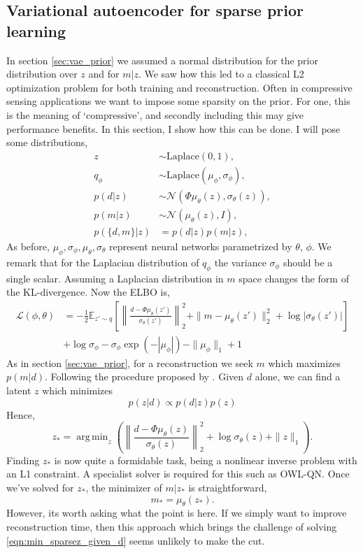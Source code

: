 \documentclass[12pt]{article}
\DeclareMathOperator*{\argmin}{arg\,min}
\begin{document}
\subsection{Variational autoencoder for sparse prior learning}\label{sec:vae_sparse_prior}
In section \ref{sec:vae_prior} we assumed a normal distribution for the prior distribution over $z$ and for $m|z$. We saw how this led to a classical L2 optimization problem for both training and reconstruction. Often in compressive sensing applications we want to impose some sparsity on the prior. For one, this is the meaning of `compressive', and secondly including this may give performance benefits. In this section, I show how this can be done. 
I will pose some distributions,
\begin{align}
z & \sim \textrm{Laplace}(0,1),\\
q_\phi & \sim \textrm{Laplace}(\mu_{\phi}, \sigma_{\phi}),\\
p(d|z) & \sim \mathcal{N}(\Phi \mu_{\theta}(z), \sigma_{\theta}(z) ),\\
p(m|z) & \sim \mathcal{N}(\mu_{\theta}(z), I),\\
p(\{d,m\}|z) & = p(d|z)p(m|z),
\end{align}
As before, $\mu_{\phi}, \sigma_{\phi}, \mu_{\theta},  \sigma_{\theta}$ represent neural networks parametrized by $\theta$, $\phi$. We remark that for the Laplacian distribution of $q_{\phi}$ the variance $\sigma_{\phi}$ should be a single scalar. Assuming a Laplacian distribution in $m$ space changes the form of the KL-divergence. Now the ELBO is,
\begin{align}
\mathcal{L}(\phi, \theta)&=-\frac{1}{2}\mathbb{E}_{z' \sim q}\left[ \left\|\frac{d-\Phi \mu_{\theta}(z')}{\sigma_{\theta}(z')}\right\|_2^2 
+ \|m- \mu_{\theta}(z')\|_2^2+ \log{|\sigma_{\theta}(z')|}\right] \nonumber\\
&+\log{\sigma_{\phi}}-\sigma_{\phi}\exp{(-|\mu_{\phi}|)}-\|\mu_{\phi}\|_1+1
\end{align}
As in section \ref{sec:vae_prior}, for a reconstruction we seek $m$ which maximizes $p(m|d)$. Following the procedure proposed by \cite{bora}. Given $d$ alone, we can find a latent $z$ which minimizes 
\begin{equation}
p(z|d) \propto p(d|z)p(z)
\end{equation}
Hence,
\begin{equation}
z_{*}=\argmin_z{\left(\left\|\frac{d-\Phi \mu_{\theta}(z)}{\sigma_{\theta}(z)}\right\|_2^2+\log{\sigma_{\theta}(z)}+\|z\|_1\right)}.\label{eqn:min_sparsez_given_d}
\end{equation} 
Finding $z_{*}$ is now quite a formidable task, being a nonlinear inverse problem with an L1 constraint. A specialist solver is required for this such as OWL-QN. Once we've solved for $z_{*}$, the minimizer of $m|z_{*}$ is straightforward,
\begin{equation}
m_{*}=\mu_{\theta}(z_*).
\end{equation}
However, its worth asking what the point is here. If we simply want to improve reconstruction time, then this approach which brings the challenge of solving \ref{eqn:min_sparsez_given_d} seems unlikely to make the cut.
\end{document}
